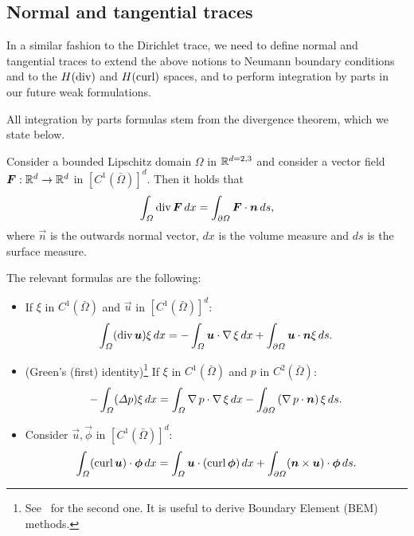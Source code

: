 \subsection{Normal and tangential traces}
In a similar fashion to the Dirichlet trace, we need to define normal and tangential traces to extend the above notions to Neumann boundary conditions and to the $H(\operatorname{\text{div}})$ and $H(\operatorname{\text{curl}})$ spaces, and to perform integration by parts in our future weak formulations.

All integration by parts formulas stem from the divergence theorem, which we state below.
\begin{theorem}\label{thm:divergence}
    Consider a bounded Lipschitz domain $\Omega$ in $\mathbb{R}^{d=2,3}$ and consider a vector field $\vec F:\R^d \to \R^d$ in $[C^1(\bar\Omega)]^d$. Then it holds that
    \begin{equation*}
        \int_\Omega \dive \vec F\,dx = \int_{\partial\Omega}\vec F\cdot \vec n\,ds,
    \end{equation*}
    where $\vec n$ is the outwards normal vector, $dx$ is the volume measure and $ds$ is the surface measure.
\end{theorem}
The relevant formulas are the following: 
\begin{itemize}
    \item If $\xi$ in $C^1(\bar\Omega)$ and $\vec u$ in $[C^1(\bar\Omega)]^d$:
    \begin{equation}
        \int_\Omega (\dive \vec u) \xi\,dx = -\int_\Omega\vec u\cdot \grad \xi\,dx + \int_{\partial\Omega} \vec u \cdot \vec n \xi\,ds.
    \end{equation}
    \item (Green's (first) identity)\footnote{See~\cite{monk2003finite} for the second one. It is useful to derive Boundary Element (BEM) methods.} If $\xi$ in $C^1(\bar\Omega)$ and $p$ in $C^2(\bar\Omega)$:
    \begin{equation}
        -\int_\Omega (\Delta p) \xi\,dx = \int_\Omega\grad p\cdot \grad \xi\,dx - \int_{\partial\Omega}\left(\grad p\cdot \vec n\right)\xi\,ds.
    \end{equation}
    \item Consider $\vec u,\vec \phi$ in $[C^1(\bar\Omega)]^d$: 
    \begin{equation}
        \int_\Omega (\curl \vec u) \cdot \vec\phi\,dx = \int_\Omega \vec u \cdot (\curl \vec \phi)\,dx  + \int_{\partial\Omega}(\vec n\times \vec u)\cdot \vec\phi\,ds.
    \end{equation}
\end{itemize}

